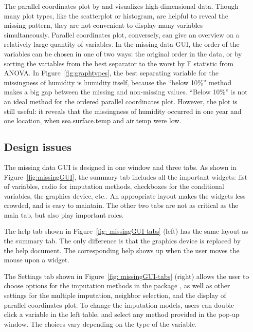 \documentclass[article]{jss}
\begin{document}
The parallel coordinates plot by \citet{inselberg1985plane} and \citet{wegman1990hyperdimensional} visualizes high-dimensional data. Though many plot types, like the scatterplot or histogram, are helpful to reveal the missing pattern, they are not convenient to display many variables simultaneously. Parallel coordinates plot, conversely, can give an overview on a relatively large quantity of variables. In the missing data GUI, the order of the variables can be chosen in one of two ways: the original order in the data, or by sorting the variables from the best separator to the worst by F statistic from ANOVA. In Figure~\ref{fig:graphtypes}, the best separating variable for the missingness of humidity is humidity itself, because the ``below 10\%'' method makes a big gap between the missing and non-missing values. ``Below 10\%'' is not an ideal method for the ordered parallel coordinates plot. However, the plot is still useful: it reveals that the missingness of humidity occurred in one year and one location, when sea.surface.temp and air.temp were low.


\subsection{Design issues}

The missing data GUI is designed in one window and three tabs. As shown in Figure~\ref{fig:missingGUI}, the summary tab includes all the important widgets: list of variables, radio for imputation methods, checkboxes for the conditional variables, the graphics device, etc.. An appropriate layout makes the widgets less crowded, and is easy to maintain. The other two tabs are not as critical as the main tab, but also play important roles.

The help tab shown in Figure~\ref{fig: missingGUI-tabs} (left) has the same layout as the summary tab. The only difference is that the graphics device is replaced by the help document. The corresponding help shows up when the user moves the mouse upon a widget.

The Settings tab shown in Figure~\ref{fig: missingGUI-tabs} (right) allows 
the user to choose options for the imputation methods in the 
package , as well as other settings for the multiple 
imputation, neighbor selection, and the display of parallel 
coordinates plot. To change the imputation models, users can double click a 
variable in the left table, and select any method provided in the pop-up window. 
The choices vary depending on the type of the variable.
\end{document}
